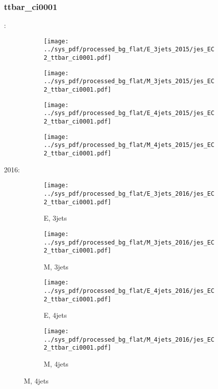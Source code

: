\documentclass{beamer}
\begin{document}
\begin{frame}
\frametitle{ttbar_ci0001}
\fontsize{5}{1}:
\begin{figure}
\centering
\begin{subfigure}[b]{0.24\textwidth}
\texttt{[image: ../sys\_pdf/processed\_bg\_flat/E\_3jets\_2015/jes\_EC2\_ttbar\_ci0001.pdf]}
\end{subfigure}
\begin{subfigure}[b]{0.24\textwidth}
\texttt{[image: ../sys\_pdf/processed\_bg\_flat/M\_3jets\_2015/jes\_EC2\_ttbar\_ci0001.pdf]}
\end{subfigure}
\begin{subfigure}[b]{0.24\textwidth}
\texttt{[image: ../sys\_pdf/processed\_bg\_flat/E\_4jets\_2015/jes\_EC2\_ttbar\_ci0001.pdf]}
\end{subfigure}
\begin{subfigure}[b]{0.24\textwidth}
\texttt{[image: ../sys\_pdf/processed\_bg\_flat/M\_4jets\_2015/jes\_EC2\_ttbar\_ci0001.pdf]}
\end{subfigure}
\end{figure}
2016:
\begin{figure}
\centering
\begin{subfigure}[b]{0.24\textwidth}
\texttt{[image: ../sys\_pdf/processed\_bg\_flat/E\_3jets\_2016/jes\_EC2\_ttbar\_ci0001.pdf]}
\captionsetup{font=tiny}
\caption{E, 3jets}
\end{subfigure}
\begin{subfigure}[b]{0.24\textwidth}
\texttt{[image: ../sys\_pdf/processed\_bg\_flat/M\_3jets\_2016/jes\_EC2\_ttbar\_ci0001.pdf]}
\captionsetup{font=tiny}
\caption{M, 3jets}
\end{subfigure}
\begin{subfigure}[b]{0.24\textwidth}
\texttt{[image: ../sys\_pdf/processed\_bg\_flat/E\_4jets\_2016/jes\_EC2\_ttbar\_ci0001.pdf]}
\captionsetup{font=tiny}
\caption{E, 4jets}
\end{subfigure}
\begin{subfigure}[b]{0.24\textwidth}
\texttt{[image: ../sys\_pdf/processed\_bg\_flat/M\_4jets\_2016/jes\_EC2\_ttbar\_ci0001.pdf]}
\captionsetup{font=tiny}
\caption{M, 4jets}
\end{subfigure}
\end{figure}
\end{frame}
\end{document}
